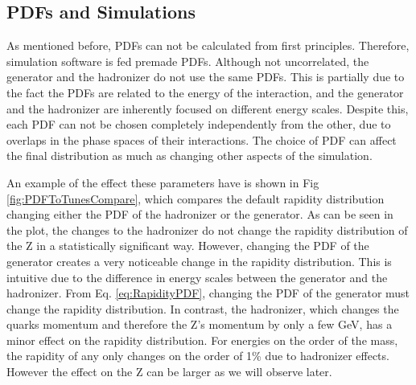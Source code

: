 \subsection{PDFs and Simulations}
As mentioned before, PDFs can not be calculated from first principles. Therefore, simulation software is fed premade PDFs. Although not uncorrelated, the generator and the hadronizer do not use the same PDFs. This is partially due to the fact the PDFs are related to the energy of the interaction, and the generator and the hadronizer are inherently focused on different energy scales. Despite this, each PDF can not be chosen completely independently from the other, due to overlaps in the phase spaces of their interactions. The choice of PDF can affect the final distribution as much as changing other aspects of the simulation.

An example of the effect these parameters have is shown in Fig \ref{fig:PDFToTunesCompare}, which compares the default \Z rapidity distribution changing either the PDF of the hadronizer or the generator. As can be seen in the plot, the changes to the hadronizer do not change the rapidity distribution of the Z in a statistically significant way. However, changing the PDF of the generator creates a very noticeable change in the rapidity distribution. This is intuitive due to the difference in energy scales between the generator and the hadronizer. From Eq. \ref{eq:RapidityPDF}, changing the PDF of the generator must change the rapidity distribution. In contrast, the hadronizer, which changes the quarks momentum and therefore the Z's momentum by only a few GeV, has a minor effect on the rapidity distribution. For energies on the order of the \Z mass, the rapidity of any \Z only changes on the order of 1\% due to hadronizer effects. However the effect on the Z \pt can be larger as we will observe later. 



